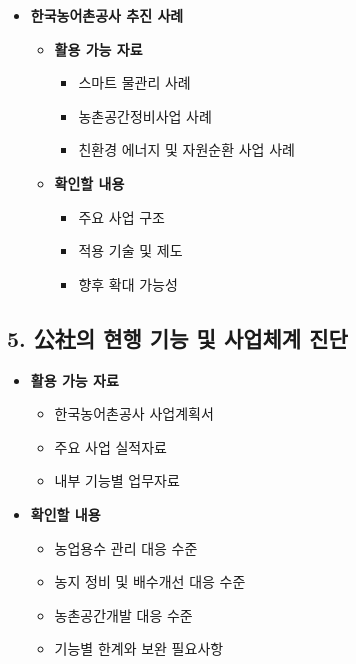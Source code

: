 \begin{itemize}
\begin{itemize}
        \item \textbf{확인할 내용}
        \begin{itemize}
            \item 용수공급 안정화 정책
            \item 재해예방형 기반정비 방향
            \item 물관리 디지털화 방향
        \end{itemize}
    \end{itemize}

    \item \textbf{한국농어촌공사 추진 사례}

    \begin{itemize}
        \item \textbf{활용 가능 자료}
        \begin{itemize}
            \item 스마트 물관리 사례
            \item 농촌공간정비사업 사례
            \item 친환경 에너지 및 자원순환 사업 사례
        \end{itemize}

        \item \textbf{확인할 내용}
        \begin{itemize}
            \item 주요 사업 구조
            \item 적용 기술 및 제도
            \item 향후 확대 가능성
        \end{itemize}
    \end{itemize}

\end{itemize}

\subsection*{5. 公社의 현행 기능 및 사업체계 진단}

\begin{itemize}

    \item \textbf{활용 가능 자료}
    \begin{itemize}
        \item 한국농어촌공사 사업계획서
        \item 주요 사업 실적자료
        \item 내부 기능별 업무자료
    \end{itemize}

    \item \textbf{확인할 내용}
    \begin{itemize}
        \item 농업용수 관리 대응 수준
        \item 농지 정비 및 배수개선 대응 수준
        \item 농촌공간개발 대응 수준
        \item 기능별 한계와 보완 필요사항
    \end{itemize}

\end{itemize}

